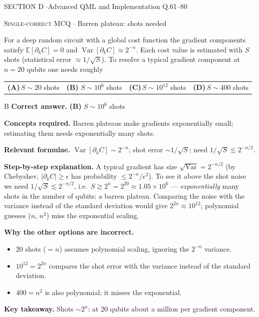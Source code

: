 \documentclass[11pt,a4paper]{article}
\newcommand{\optlabel}[1]{\textbf{(#1)}}
\newcommand{\correctlabel}[1]{\textcolor{okgreen}{\textbf{(#1)}\,\ding{51}}}
\newenvironment{qitem}[1]{\begin{list}{}{\setlength{\leftmargin}{3.3em}\setlength{\labelwidth}{3.1em}%
  \setlength{\labelsep}{0.2em}\setlength{\topsep}{3pt}\setlength{\parsep}{3pt}}\item[\textbf{Q.#1}\hfill]}{\end{list}}
\newcommand{\qsep}{\par\vspace{2pt}{\color{black!15}\hrule}\vspace{4pt}}
\newcommand{\qmeta}[2]{{\footnotesize\color{black!60}\textsc{#1} \;$\cdot$\; #2}\par}
\begin{document}
\newpage

\begin{sectionbanner}SECTION D \enspace$\cdot$\enspace Advanced QML and Implementation \hfill Q.61--80\end{sectionbanner}

\begin{qitem}{61}
\qmeta{Single-correct MCQ}{Barren plateau: shots needed}
For a deep random circuit with a global cost function the gradient components satisfy $\mathbb E[\partial_kC] = 0$ and
$\operatorname{Var}[\partial_kC] \approx 2^{-n}$. Each cost value is estimated with $S$ shots (statistical error $\approx 1/\sqrt S$). To resolve a
typical gradient component at $n = 20$ qubits one needs roughly
\par\smallskip\noindent\begin{tabularx}{\linewidth}{@{}*{4}{L}@{}}
\optlabel{A}\,$S \sim 20$ shots & \correctlabel{B}\,$S \sim 10^{6}$ shots & \optlabel{C}\,$S \sim 10^{12}$ shots & \optlabel{D}\,$S \sim 400$ shots
\end{tabularx}
\end{qitem}
\begin{solbox}{B}
\textbf{\color{brand}Correct answer.} \textcolor{okgreen}{\textbf{(B)}} $S \sim 10^{6}$ shots

\textbf{\color{brand}Concepts required.} Barren plateaus make gradients exponentially small; estimating them needs exponentially many shots.

\textbf{\color{brand}Relevant formulae.} $\operatorname{Var}[\partial_kC] \sim 2^{-n}$; shot error $\sim 1/\sqrt S$; need $1/\sqrt S \lesssim 2^{-n/2}$.

\textbf{\color{brand}Step-by-step explanation.} A typical gradient has size $\sqrt{\operatorname{Var}} = 2^{-n/2}$ (by Chebyshev, $|\partial_kC| \ge \epsilon$ has probability $\le 2^{-n}/\epsilon^2$).
To see it above the shot noise we need $1/\sqrt S \lesssim 2^{-n/2}$, i.e.\ $S \gtrsim 2^n = 2^{20} \approx 1.05\times10^6$ ---
\emph{exponentially} many shots in the number of qubits: a barren plateau. Comparing the noise with the variance instead of the
standard deviation would give $2^{2n} \approx 10^{12}$; polynomial guesses ($n$, $n^2$) miss the exponential scaling.

\textbf{\color{brand}Why the other options are incorrect.}
\begin{itemize}[leftmargin=2.4em, itemsep=1pt, topsep=2pt]
\item[\textbf{(A)}] $20$ shots ($= n$) assumes polynomial scaling, ignoring the $2^{-n}$ variance.
\item[\textbf{(C)}] $10^{12} = 2^{2n}$ compares the shot error with the variance instead of the standard deviation.
\item[\textbf{(D)}] $400 = n^2$ is also polynomial; it misses the exponential.
\end{itemize}
\textbf{\color{brand}Key takeaway.} Shots $\sim 2^n$: at 20 qubits about a million per gradient component.
\end{solbox}
\qsep
\end{document}
